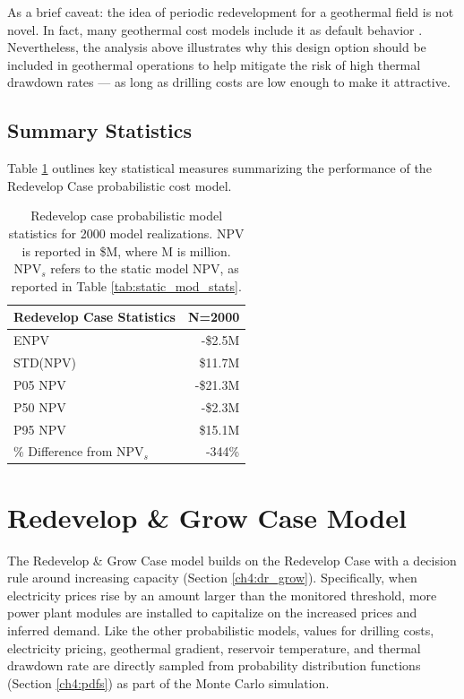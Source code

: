 As a brief caveat: the idea of periodic redevelopment for a geothermal field is not novel. In fact, many geothermal cost models include it as default behavior \citep[e.g.,\ ][]{entingh_volume_2006, blair_system_2018}. Nevertheless, the analysis above illustrates why this design option should be included in geothermal operations to help mitigate the risk of high thermal drawdown rates --- as long as drilling costs are low enough to make it attractive. 

\subsection{Summary Statistics}\label{ch6:redevelop_stats}
Table \ref{tab:redevelop_stats} outlines key statistical measures summarizing the performance of the Redevelop Case probabilistic cost model.

\begin{table}[H]
\centering
\begin{tabular}{|l|r|}
\hline
\textbf{Redevelop Case Statistics} & N=2000 \\ \hline
ENPV & -\$2.5M \\ \hline
STD(NPV) & \$11.7M \\ \hline
P05 NPV & -\$21.3M \\ \hline
P50 NPV & -\$2.3M \\ \hline
P95 NPV & \$15.1M \\ \hline
\% Difference from NPV$_{s}$ & -344\% \\ \hline
\end{tabular}
\caption[Probabilistic Redevelop Case statistics]{Redevelop case probabilistic model statistics for 2000 model realizations. NPV is reported in \$M, where M is million. NPV$_s$ refers to the static model NPV, as reported in Table \ref{tab:static_mod_stats}.}
\label{tab:redevelop_stats}
\end{table}

\section{Redevelop \& Grow Case Model}\label{ch6:grow_case}
The Redevelop \& Grow Case model builds on the Redevelop Case with a decision rule around increasing capacity (Section \ref{ch4:dr_grow}). Specifically, when electricity prices rise by an amount larger than the monitored threshold, more power plant modules are installed to capitalize on the increased prices and inferred demand. Like the other probabilistic models, values for drilling costs, electricity pricing, geothermal gradient, reservoir temperature, and thermal drawdown rate are directly sampled from probability distribution functions (Section \ref{ch4:pdfs}) as part of the Monte Carlo simulation.

